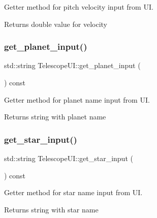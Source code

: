 Getter method for pitch velocity input from UI. 

\begin{DoxyReturn}{Returns}
double value for velocity 
\end{DoxyReturn}
\mbox{\label{classTelescopeUI_a821001a5b68adc425ca4b5abf40c1d20}} 
\subsubsection{\texorpdfstring{get\+\_\+planet\+\_\+input()}{get\_planet\_input()}}
{\footnotesize\ttfamily std\+::string Telescope\+U\+I\+::get\+\_\+planet\+\_\+input (\begin{DoxyParamCaption}{ }\end{DoxyParamCaption}) const}



Getter method for planet name input from UI. 

\begin{DoxyReturn}{Returns}
string with planet name 
\end{DoxyReturn}
\mbox{\label{classTelescopeUI_a6253863c7f48f2f403b44e1811f6dd2b}} 
\subsubsection{\texorpdfstring{get\+\_\+star\+\_\+input()}{get\_star\_input()}}
{\footnotesize\ttfamily std\+::string Telescope\+U\+I\+::get\+\_\+star\+\_\+input (\begin{DoxyParamCaption}{ }\end{DoxyParamCaption}) const}



Getter method for star name input from UI. 

\begin{DoxyReturn}{Returns}
string with star name 
\end{DoxyReturn}
\mbox{\label{classTelescopeUI_a617d9d50d6e4a50f58bf65658b2191b8}} 
